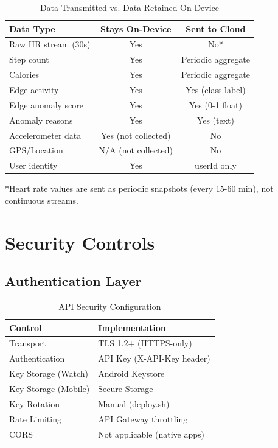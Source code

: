\documentclass[conference]{IEEEtran}
\begin{document}
\begin{table}[H]
\centering
\caption{Data Transmitted vs. Data Retained On-Device}
\label{tab:data_min}
\begin{tabular}{lcc}
\toprule
\textbf{Data Type} & \textbf{Stays On-Device} & \textbf{Sent to Cloud} \\
\midrule
Raw HR stream (30s) & Yes & No* \\
Step count & Yes & Periodic aggregate \\
Calories & Yes & Periodic aggregate \\
Edge activity & Yes & Yes (class label) \\
Edge anomaly score & Yes & Yes (0-1 float) \\
Anomaly reasons & Yes & Yes (text) \\
Accelerometer data & Yes (not collected) & No \\
GPS/Location & N/A (not collected) & No \\
User identity & Yes & userId only \\
\bottomrule
\end{tabular}
\end{table}

*Heart rate values are sent as periodic snapshots (every 15-60 min), not continuous streams.

\section{Security Controls}

\subsection{Authentication Layer}

\begin{table}[H]
\centering
\caption{API Security Configuration}
\label{tab:api_security}
\begin{tabular}{ll}
\toprule
\textbf{Control} & \textbf{Implementation} \\
\midrule
Transport & TLS 1.2+ (HTTPS-only) \\
Authentication & API Key (X-API-Key header) \\
Key Storage (Watch) & Android Keystore \\
Key Storage (Mobile) & Secure Storage \\
Key Rotation & Manual (deploy.sh) \\
Rate Limiting & API Gateway throttling \\
CORS & Not applicable (native apps) \\
\bottomrule
\end{tabular}
\end{table}
\end{document}

